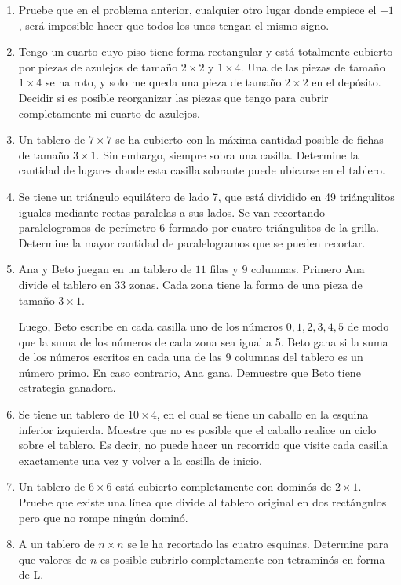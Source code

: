 \begin{enumerate}
	\item Pruebe que en el problema anterior, cualquier otro lugar donde empiece el $-1$, ser\'a imposible hacer que todos los unos tengan el mismo signo.
	
	\item Tengo un cuarto cuyo piso tiene forma rectangular y est\'a totalmente cubierto por piezas de azulejos de tamaño $2 \times 2$ y $1\times 4$. Una de las piezas de tamaño $1\times 4$ se ha roto, y solo me queda una pieza de tamaño $2\times 2$ en el dep\'osito. Decidir si es posible reorganizar las piezas que tengo para cubrir completamente mi cuarto de azulejos.
	
	\item Un tablero de $7 \times 7$ se ha cubierto con la m\'axima cantidad posible de fichas de tamaño $3\times 1$. Sin embargo, siempre sobra una casilla. Determine la cantidad de lugares donde esta casilla sobrante puede ubicarse en el tablero.
	
	\item Se tiene un tri\'angulo equil\'atero de lado 7, que est\'a dividido en 49 tri\'angulitos iguales mediante rectas paralelas a sus lados. Se van recortando paralelogramos de per\'imetro 6 formado por cuatro tri\'angulitos de la grilla. Determine la mayor cantidad de paralelogramos que se pueden recortar.
	
	\item Ana y Beto juegan en un tablero de $11$ filas y $9$ columnas. Primero Ana divide el tablero en $33$ zonas. Cada zona tiene la forma de una pieza de tamaño $3\times 1$. 
	
	Luego, Beto escribe en cada casilla uno de los n\'umeros $0, 1, 2, 3, 4, 5$ de modo que la suma de los n\'umeros de cada zona sea igual a 5. Beto gana si la suma de los n\'umeros escritos en cada una de las 9 columnas del tablero es un n\'umero primo. En caso contrario, Ana gana. Demuestre que Beto tiene estrategia ganadora. 
	
	\item Se tiene un tablero de $10\times 4$, en el cual se tiene un caballo en la esquina inferior izquierda. Muestre que no es posible que el caballo realice un ciclo sobre el tablero. Es decir, no puede hacer un recorrido que visite cada casilla exactamente una vez y volver a la casilla de inicio.
	
	\item Un tablero de $6 \times 6$ est\'a cubierto completamente con domin\'os de $2\times 1$. Pruebe que existe una l\'inea que divide al tablero original en dos rect\'angulos pero que no rompe ning\'un domin\'o.
	
	\item A un tablero de $n\times n$ se le ha recortado las cuatro esquinas. Determine para que valores de $n$ es posible cubrirlo completamente con tetramin\'os en forma de L.
	
	
\end{enumerate}
